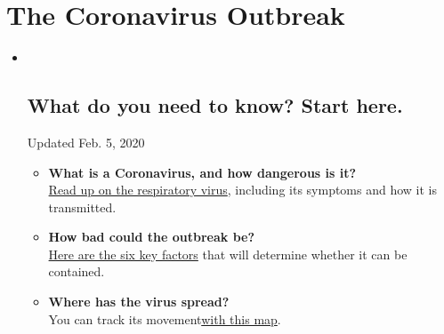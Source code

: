 \hypertarget{the-coronavirus-outbreak}{%
\section{The Coronavirus Outbreak}\label{the-coronavirus-outbreak}}

\begin{itemize}
\item ~
  \hypertarget{what-do-you-need-to-know-start-here}{%
  \subsection{What do you need to know? Start
  here.}\label{what-do-you-need-to-know-start-here}}

  Updated Feb. 5, 2020

  \begin{itemize}
  \tightlist
  \item
    \textbf{What is a Coronavirus, and how dangerous is it?}\\
    \href{https://web.archive.org/web/20200206210009/https://www.nytimes.com/article/what-is-coronavirus.html?action=click\&pgtype=Article\&state=default\&module=styln-coronavirus®ion=MID_MAIN_CONTENT\&context=storyline_guide}{Read
    up on the respiratory virus}, including its symptoms and how it is
    transmitted.
  \end{itemize}

  \begin{itemize}
  \tightlist
  \item
    \textbf{How bad could the outbreak be?}\\
    \href{https://web.archive.org/web/20200206210009/https://www.nytimes.com/interactive/2020/world/asia/china-coronavirus-contain.html?action=click\&pgtype=Article\&state=default\&module=styln-coronavirus®ion=MID_MAIN_CONTENT\&context=storyline_guide}{}\href{https://web.archive.org/web/20200206210009/https://www.nytimes.com/interactive/2020/world/asia/china-coronavirus-contain.html?action=click\&pgtype=Article\&state=default\&module=styln-coronavirus®ion=MID_MAIN_CONTENT\&context=storyline_guide}{Here
    are the six key factors} that will determine whether it can be
    contained.
  \end{itemize}

  \begin{itemize}
  \tightlist
  \item
    \textbf{Where has the virus spread?}\\
    You can track its
    movement\href{https://web.archive.org/web/20200206210009/https://www.nytimes.com/interactive/2020/world/asia/china-wuhan-coronavirus-maps.html?action=click\&pgtype=Article\&state=default\&module=styln-coronavirus®ion=MID_MAIN_CONTENT\&context=storyline_guide?smid=nytcore-ios-share}{}\href{https://web.archive.org/web/20200206210009/https://www.nytimes.com/interactive/2020/world/asia/china-wuhan-coronavirus-maps.html?action=click\&pgtype=Article\&state=default\&module=styln-coronavirus®ion=MID_MAIN_CONTENT\&context=storyline_guide?smid=nytcore-ios-share}{with
    this map}.
  \end{itemize}


\end{itemize}
